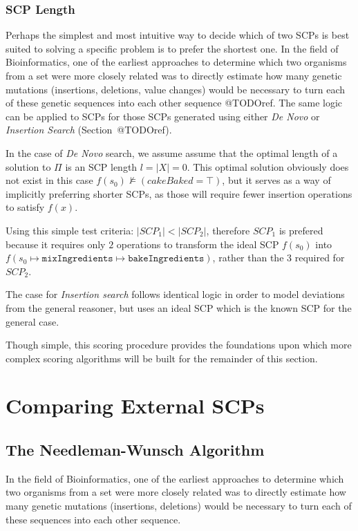 \subsubsection{SCP Length}
Perhaps the simplest and most intuitive way to decide which of two SCPs is best suited to solving a specific problem is to prefer the shortest one. In the field of Bioinformatics, one of the earliest approaches to determine which two organisms from a set were more closely related was to directly estimate how many genetic mutations (insertions, deletions, value changes) would be necessary to turn each of these genetic sequences into each other sequence @TODOref. The same logic can be applied to SCPs for those SCPs generated using either \textit{De Novo} or \textit{Insertion Search} (Section~@TODOref).

In the case of \textit{De Novo} search, we assume assume that the optimal length of a solution to $\Pi$ is an SCP length $l=|X|=0$. This optimal solution obviously does not exist in this case $f(s_0) \not\models (cakeBaked = \top)$, but it serves as a way of implicitly preferring shorter SCPs, as those will require fewer insertion operations to satisfy $f(x)$. 

Using this simple test criteria: $|SCP_1| < |SCP_2|$, therefore $SCP_1$ is prefered because it requires only $2$ operations to transform the ideal SCP $f(s_0)$ into $f(s_0\longmapsto \texttt{mixIngredients} \longmapsto \texttt{bakeIngredients})$, rather than the $3$ required for $SCP_2$.

The case for \textit{Insertion search} follows identical logic in order to model deviations from the general reasoner, but uses an ideal SCP which is the known SCP for the general case.

Though simple, this scoring procedure provides the foundations upon which more complex scoring algorithms will be built for the remainder of this section.

\section{Comparing External SCPs} \label{ssec:compExt}
\subsection{The Needleman-Wunsch Algorithm} \label{ssec:nw}
In the field of Bioinformatics, one of the earliest approaches to determine which two organisms from a set were more closely related was to directly estimate how many genetic mutations (insertions, deletions) would be necessary to turn each of these sequences into each other sequence.

